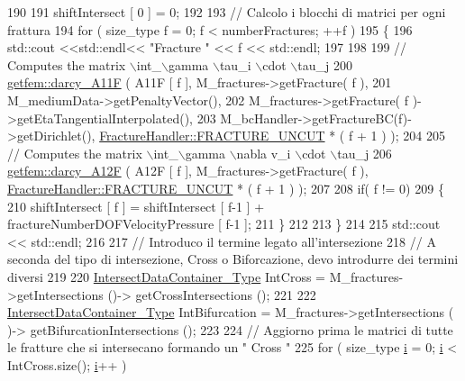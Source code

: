 \begin{DoxyCode}
190     
191     shiftIntersect [ 0 ] = 0;
192     
193     \textcolor{comment}{// Calcolo i blocchi di matrici per ogni frattura}
194     \textcolor{keywordflow}{for} ( size\_type f = 0; f < numberFractures; ++f )
195     \{
196         std::cout <<std::endl<< \textcolor{stringliteral}{"Fracture "} << f << std::endl;
197 
198         
199         \textcolor{comment}{// Computes the matrix \(\backslash\)int\_\(\backslash\)gamma \(\backslash\)tau\_i \(\backslash\)cdot \(\backslash\)tau\_j}
200         \hyperlink{namespacegetfem_aba6f1b4f1d395aae3d96071cad4953a2}{getfem::darcy\_A11F} ( A11F [ f ], M\_fractures->getFracture( f ),
201                              M\_mediumData->getPenaltyVector(),
202                              M\_fractures->getFracture( f )->getEtaTangentialInterpolated(),
203                              M\_bcHandler->getFractureBC(f)->getDirichlet(), 
      \hyperlink{classFractureHandler_a495ad4fc72d0c47c8f0424842f1153aaaa992cc3ad024a030ecd798dc319c95ac}{FractureHandler::FRACTURE\_UNCUT} * ( f + 1 ) );
204 
205         \textcolor{comment}{// Computes the matrix \(\backslash\)int\_\(\backslash\)gamma \(\backslash\)nabla v\_i \(\backslash\)cdot \(\backslash\)tau\_j}
206         \hyperlink{namespacegetfem_ab62aa98cfcf55810e1518906202cbedc}{getfem::darcy\_A12F} ( A12F [ f ], M\_fractures->getFracture( f ), 
      \hyperlink{classFractureHandler_a495ad4fc72d0c47c8f0424842f1153aaaa992cc3ad024a030ecd798dc319c95ac}{FractureHandler::FRACTURE\_UNCUT} * ( f + 1 ) );
207         
208         \textcolor{keywordflow}{if}( f != 0)
209         \{
210             shiftIntersect [ f ] = shiftIntersect [ f-1 ] + fractureNumberDOFVelocityPressure [ f-1 ];  
211         \}
212         
213     \}
214 
215     std::cout << std::endl;
216     
217     \textcolor{comment}{// Introduco il termine legato all'intersezione}
218     \textcolor{comment}{// A seconda del tipo di intersezione, Cross o Biforcazione, devo introdurre dei termini diversi}
219   
220     \hyperlink{IntersectData_8h_a822ec3b760dfb603e1cf0bfe3ad5636a}{IntersectDataContainer\_Type} IntCross = M\_fractures->getIntersections ()-> 
      getCrossIntersections ();
221     
222     \hyperlink{IntersectData_8h_a822ec3b760dfb603e1cf0bfe3ad5636a}{IntersectDataContainer\_Type} IntBifurcation = M\_fractures->getIntersections (
      )-> getBifurcationIntersections ();
223         
224     \textcolor{comment}{// Aggiorno prima le matrici di tutte le fratture che si intersecano formando un " Cross "}
225     \textcolor{keywordflow}{for} ( size\_type \hyperlink{matrici_8m_a6f6ccfcf58b31cb6412107d9d5281426}{i} = 0; \hyperlink{matrici_8m_a6f6ccfcf58b31cb6412107d9d5281426}{i} < IntCross.size(); \hyperlink{matrici_8m_a6f6ccfcf58b31cb6412107d9d5281426}{i}++ )

\end{DoxyCode}
